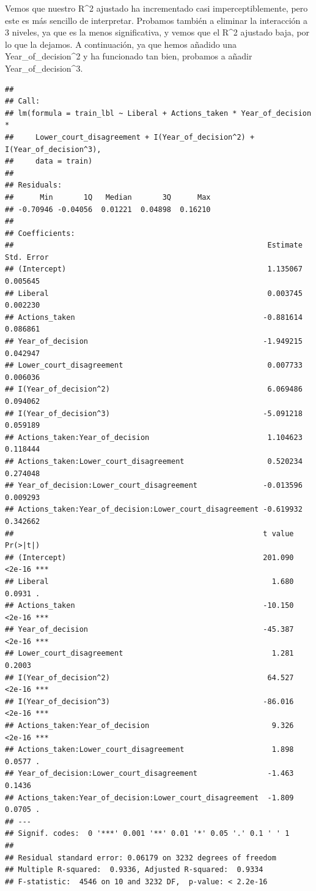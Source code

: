 \documentclass[
]{article}
\begin{document}
Vemos que nuestro R\^{}2 ajustado ha incrementado casi
imperceptiblemente, pero este es más sencillo de interpretar. Probamos
también a eliminar la interacción a 3 niveles, ya que es la menos
significativa, y vemos que el R\^{}2 ajustado baja, por lo que la
dejamos. A continuación, ya que hemos añadido una
Year\_of\_decision\^{}2 y ha funcionado tan bien, probamos a añadir
Year\_of\_decision\^{}3.

\begin{verbatim}
## 
## Call:
## lm(formula = train_lbl ~ Liberal + Actions_taken * Year_of_decision * 
##     Lower_court_disagreement + I(Year_of_decision^2) + I(Year_of_decision^3), 
##     data = train)
## 
## Residuals:
##      Min       1Q   Median       3Q      Max 
## -0.70946 -0.04056  0.01221  0.04898  0.16210 
## 
## Coefficients:
##                                                          Estimate Std. Error
## (Intercept)                                              1.135067   0.005645
## Liberal                                                  0.003745   0.002230
## Actions_taken                                           -0.881614   0.086861
## Year_of_decision                                        -1.949215   0.042947
## Lower_court_disagreement                                 0.007733   0.006036
## I(Year_of_decision^2)                                    6.069486   0.094062
## I(Year_of_decision^3)                                   -5.091218   0.059189
## Actions_taken:Year_of_decision                           1.104623   0.118444
## Actions_taken:Lower_court_disagreement                   0.520234   0.274048
## Year_of_decision:Lower_court_disagreement               -0.013596   0.009293
## Actions_taken:Year_of_decision:Lower_court_disagreement -0.619932   0.342662
##                                                         t value Pr(>|t|)    
## (Intercept)                                             201.090   <2e-16 ***
## Liberal                                                   1.680   0.0931 .  
## Actions_taken                                           -10.150   <2e-16 ***
## Year_of_decision                                        -45.387   <2e-16 ***
## Lower_court_disagreement                                  1.281   0.2003    
## I(Year_of_decision^2)                                    64.527   <2e-16 ***
## I(Year_of_decision^3)                                   -86.016   <2e-16 ***
## Actions_taken:Year_of_decision                            9.326   <2e-16 ***
## Actions_taken:Lower_court_disagreement                    1.898   0.0577 .  
## Year_of_decision:Lower_court_disagreement                -1.463   0.1436    
## Actions_taken:Year_of_decision:Lower_court_disagreement  -1.809   0.0705 .  
## ---
## Signif. codes:  0 '***' 0.001 '**' 0.01 '*' 0.05 '.' 0.1 ' ' 1
## 
## Residual standard error: 0.06179 on 3232 degrees of freedom
## Multiple R-squared:  0.9336, Adjusted R-squared:  0.9334 
## F-statistic:  4546 on 10 and 3232 DF,  p-value: < 2.2e-16
\end{verbatim}
\end{document}
